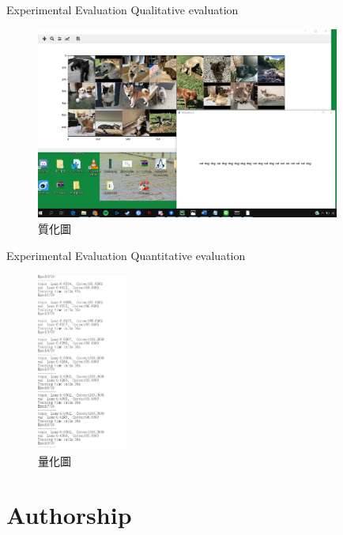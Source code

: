 \documentclass{beamer}
\begin{document}
\begin{frame}{ Experimental Evaluation }{Qualitative evaluation }
\begin{CJK*}{UTF8}{bsmi}
\begin{figure}[h]
\begin{center}
\includegraphics[width=10cm]{eval.jpg} 
\end{center} 
\label{fig:1} 
\caption{質化圖} 
\end{figure}
\end{CJK*}
\end{frame}

\begin{frame}{ Experimental Evaluation }{Quantitative evaluation }
\begin{CJK*}{UTF8}{bsmi}
\begin{figure}[h]
\begin{center}
\includegraphics[width=3cm]{qua.jpg} 
\end{center} 
\label{fig:1} 
\caption{量化圖} 
\end{figure}
\end{CJK*}
\end{frame}

\section{Authorship}
\end{document}
